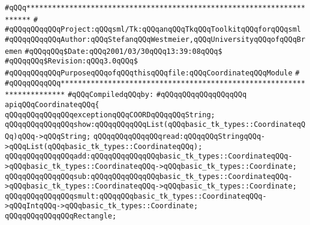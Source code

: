 \label{src/lib/tk/src/coordinate.api}
\verb|#qQQq***********************************************************************|\newline
\verb|#|\newline
\verb|#qQQqqQQqqQQqProject:qQQqsml/Tk:qQQqanqQQqTkqQQqToolkitqQQqforqQQqsml|\newline
\verb|#qQQqqQQqqQQqAuthor:qQQqStefanqQQqWestmeier,qQQqUniversityqQQqofqQQqBremen|\newline
\verb|#qQQqqQQq$Date:qQQq2001/03/30qQQq13:39:08qQQq$|\newline
\verb|#qQQqqQQq$Revision:qQQq3.0qQQq$|\newline
\verb|#qQQqqQQqqQQqPurposeqQQqofqQQqthisqQQqfile:qQQqCoordinateqQQqModule|\newline
\verb|#|\newline
\verb|#qQQqqQQqqQQq***********************************************************************|\newline
\newline
\verb|#qQQqCompiledqQQqby:|\newline
\verb|#qQQqqQQqqQQqqQQqqQQq|\newline
\newline
\verb|apiqQQqCoordinateqQQq{|\newline
\newline
\verb|qQQqqQQqqQQqqQQqexceptionqQQqCOORDqQQqqQQqString;|\newline
\newline
\verb|qQQqqQQqqQQqqQQqshow:qQQqqQQqqQQqList(qQQqbasic_tk_types::CoordinateqQQq)qQQq->qQQqString;|\newline
\verb|qQQqqQQqqQQqqQQqread:qQQqqQQqStringqQQq->qQQqList(qQQqbasic_tk_types::CoordinateqQQq);|\newline
\newline
\verb|qQQqqQQqqQQqqQQqadd:qQQqqQQqqQQqqQQqbasic_tk_types::CoordinateqQQq->qQQqbasic_tk_types::CoordinateqQQq->qQQqbasic_tk_types::Coordinate;|\newline
\verb|qQQqqQQqqQQqqQQqsub:qQQqqQQqqQQqqQQqbasic_tk_types::CoordinateqQQq->qQQqbasic_tk_types::CoordinateqQQq->qQQqbasic_tk_types::Coordinate;|\newline
\verb|qQQqqQQqqQQqqQQqsmult:qQQqqQQqbasic_tk_types::CoordinateqQQq->qQQqIntqQQq->qQQqbasic_tk_types::Coordinate;|\newline
\newline
\verb|qQQqqQQqqQQqqQQqRectangle;|\newline
